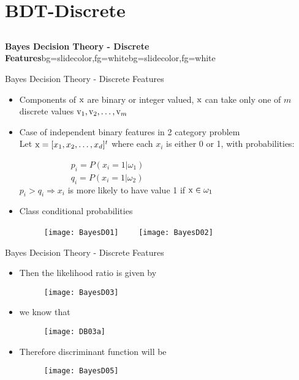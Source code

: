 \section{BDT-Discrete}
\subsection{}
\begin{frame}{}
\begin{variableblock}{\centering \Large \textbf{\vspace{4pt}\newline Bayes Decision Theory - Discrete Features\vspace{4pt}}}{bg=slidecolor,fg=white}{bg=slidecolor,fg=white}
\end{variableblock}
\end{frame}

\begin{frame}{Bayes Decision Theory - Discrete Features}
\begin{itemize}
\item Components of ${\rm x}$ are binary or integer valued, ${\rm x}$ can take only one of $m$ discrete values ${\rm v}_1,{\rm v}_2,\ldots,{\rm v}_m$
\item Case of independent binary features in 2 category problem\\
Let ${\rm x}=[x_1,x_2,\ldots,x_d]^t$ where each $x_i$ is either 0 or 1, with probabilities:

~~~~~~~~~~~~$p_i=P(x_i=1|\omega_1)$\\
~~~~~~~~~~~~$q_i=P(x_i=1|\omega_2)$\\
$p_i>q_i\Rightarrow x_i$ is more likely to have value 1 if ${\rm x}\in \omega_1$
\item Class conditional probabilities
\begin{figure}
\texttt{[image: BayesD01]}~~~~
\texttt{[image: BayesD02]}
\end{figure}
\end{itemize}
\end{frame}

\begin{frame}{Bayes Decision Theory - Discrete Features}
\begin{itemize}
\item Then the likelihood ratio is given by
\begin{figure}
\texttt{[image: BayesD03]}
\end{figure}
\item we know that
\begin{figure}
\texttt{[image: DB03a]}
\end{figure}
\item Therefore discriminant function will be
\begin{figure}
\texttt{[image: BayesD05]}
\end{figure}
\end{itemize}
\end{frame}


